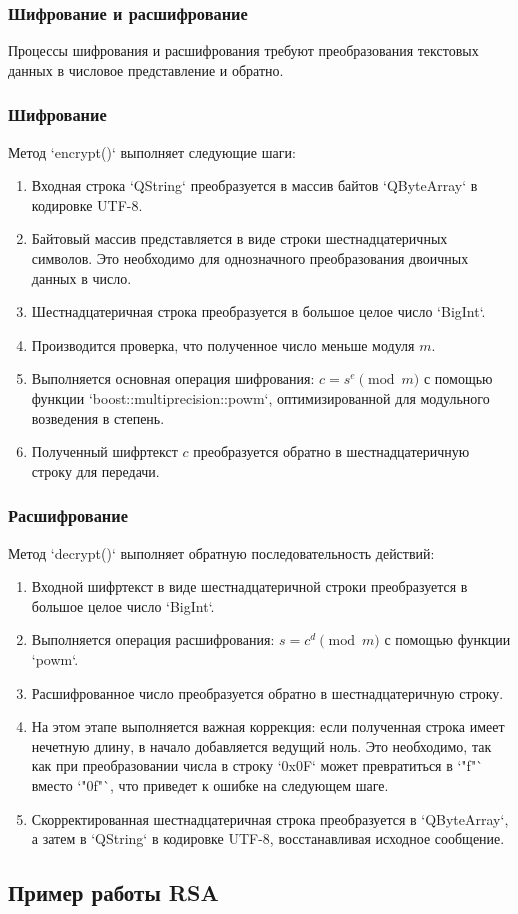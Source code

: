 

\subsubsection{Шифрование и расшифрование}
Процессы шифрования и расшифрования требуют преобразования текстовых данных в числовое представление и обратно.

\subsubsection*{Шифрование}
Метод `encrypt()` выполняет следующие шаги:
\begin{enumerate}
    \item Входная строка `QString` преобразуется в массив байтов `QByteArray` в кодировке UTF-8.
    \item Байтовый массив представляется в виде строки шестнадцатеричных символов. Это необходимо для однозначного преобразования двоичных данных в число.
    \item Шестнадцатеричная строка преобразуется в большое целое число `BigInt`.
    \item Производится проверка, что полученное число меньше модуля $m$.
    \item Выполняется основная операция шифрования: $c = s^e \pmod m$ с помощью функции `boost::multiprecision::powm`, оптимизированной для модульного возведения в степень.
    \item Полученный шифртекст $c$ преобразуется обратно в шестнадцатеричную строку для передачи.
\end{enumerate}



\subsubsection*{Расшифрование}
Метод `decrypt()` выполняет обратную последовательность действий:
\begin{enumerate}
    \item Входной шифртекст в виде шестнадцатеричной строки преобразуется в большое целое число `BigInt`.
    \item Выполняется операция расшифрования: $s = c^d \pmod m$ с помощью функции `powm`.
    \item Расшифрованное число преобразуется обратно в шестнадцатеричную строку.
    \item На этом этапе выполняется важная коррекция: если полученная строка имеет нечетную длину, в начало добавляется ведущий ноль. Это необходимо, так как при преобразовании числа в строку `0x0F` может превратиться в `"f"` вместо `"0f"`, что приведет к ошибке на следующем шаге.
    \item Скорректированная шестнадцатеричная строка преобразуется в `QByteArray`, а затем в `QString` в кодировке UTF-8, восстанавливая исходное сообщение.
\end{enumerate}



\subsection{Пример работы RSA}
